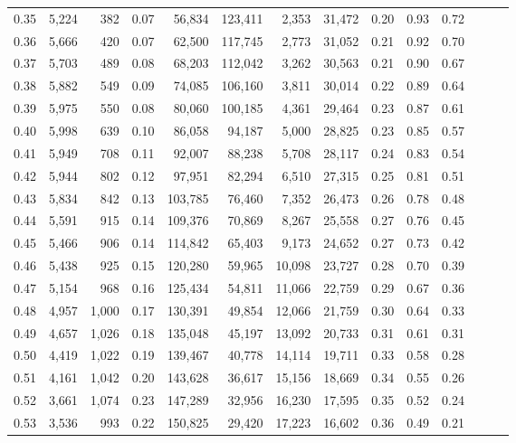 \begin{tabular}{rrrrrrrrrrrrrr}
0.35 &  5,224 &    382 &  0.07 &   56,834 &  123,411 &   2,353 &  31,472 &  0.20 &  0.93 &      0.72 \\
0.36 &  5,666 &    420 &  0.07 &   62,500 &  117,745 &   2,773 &  31,052 &  0.21 &  0.92 &      0.70 \\
0.37 &  5,703 &    489 &  0.08 &   68,203 &  112,042 &   3,262 &  30,563 &  0.21 &  0.90 &      0.67 \\
0.38 &  5,882 &    549 &  0.09 &   74,085 &  106,160 &   3,811 &  30,014 &  0.22 &  0.89 &      0.64 \\
0.39 &  5,975 &    550 &  0.08 &   80,060 &  100,185 &   4,361 &  29,464 &  0.23 &  0.87 &      0.61 \\
0.40 &  5,998 &    639 &  0.10 &   86,058 &   94,187 &   5,000 &  28,825 &  0.23 &  0.85 &      0.57 \\
0.41 &  5,949 &    708 &  0.11 &   92,007 &   88,238 &   5,708 &  28,117 &  0.24 &  0.83 &      0.54 \\
0.42 &  5,944 &    802 &  0.12 &   97,951 &   82,294 &   6,510 &  27,315 &  0.25 &  0.81 &      0.51 \\
0.43 &  5,834 &    842 &  0.13 &  103,785 &   76,460 &   7,352 &  26,473 &  0.26 &  0.78 &      0.48 \\
0.44 &  5,591 &    915 &  0.14 &  109,376 &   70,869 &   8,267 &  25,558 &  0.27 &  0.76 &      0.45 \\
0.45 &  5,466 &    906 &  0.14 &  114,842 &   65,403 &   9,173 &  24,652 &  0.27 &  0.73 &      0.42 \\
0.46 &  5,438 &    925 &  0.15 &  120,280 &   59,965 &  10,098 &  23,727 &  0.28 &  0.70 &      0.39 \\
0.47 &  5,154 &    968 &  0.16 &  125,434 &   54,811 &  11,066 &  22,759 &  0.29 &  0.67 &      0.36 \\
0.48 &  4,957 &  1,000 &  0.17 &  130,391 &   49,854 &  12,066 &  21,759 &  0.30 &  0.64 &      0.33 \\
0.49 &  4,657 &  1,026 &  0.18 &  135,048 &   45,197 &  13,092 &  20,733 &  0.31 &  0.61 &      0.31 \\
0.50 &  4,419 &  1,022 &  0.19 &  139,467 &   40,778 &  14,114 &  19,711 &  0.33 &  0.58 &      0.28 \\
0.51 &  4,161 &  1,042 &  0.20 &  143,628 &   36,617 &  15,156 &  18,669 &  0.34 &  0.55 &      0.26 \\
0.52 &  3,661 &  1,074 &  0.23 &  147,289 &   32,956 &  16,230 &  17,595 &  0.35 &  0.52 &      0.24 \\
0.53 &  3,536 &    993 &  0.22 &  150,825 &   29,420 &  17,223 &  16,602 &  0.36 &  0.49 &      0.21 \\

\end{tabular}
